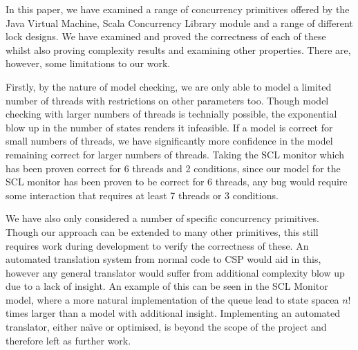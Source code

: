 In this paper, we have examined a range of concurrency primitives offered by the Java Virtual Machine, Scala Concurrency Library module and a range of different lock designs. We have examined and proved the correctness of each of these whilst also proving complexity results and examining other properties. There are, however, some limitations to our work. 

Firstly, by the nature of model checking, we are only able to model a limited number of threads with restrictions on other parameters too. Though model checking with larger numbers of threads is technially possible, the exponential blow up in the number of states renders it infeasible.
If a model is correct for small numbers of threads, we have significantly more confidence in the model remaining correct for larger numbers of threads. Taking the SCL monitor which has been proven correct for 6 threads and 2 conditions, since our model for the SCL monitor has been proven to be correct for 6 threads, any bug would require some interaction that requires at least 7 threads or 3 conditions.

We have also only considered a number of specific concurrency primitives. Though our approach can be extended to many other primitives, this still requires work during development to verify the correctness of these. An automated translation system from normal code to CSP would aid in this, however any general translator would suffer from additional complexity blow up due to a lack of insight. An example of this can be seen in the SCL Monitor model, where a more natural implementation of the queue lead to state spacea $n!$ times larger than a model with additional insight. Implementing an automated translator, either na\"{\i}ve or optimised, is beyond the scope of the project and therefore left as further work. 